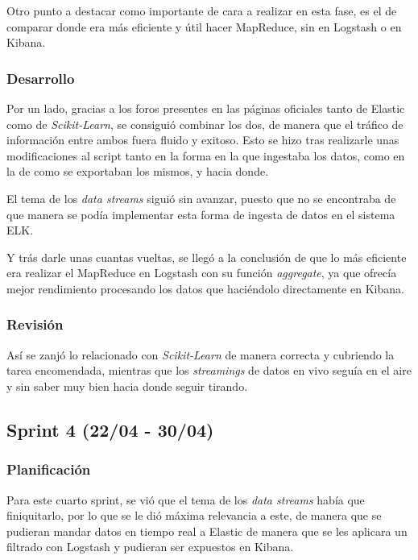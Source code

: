 Otro punto a destacar como importante de cara a realizar en esta fase, es el de comparar donde era más eficiente y útil hacer MapReduce, sin en Logstash o en Kibana.

\subsubsection{Desarrollo}
Por un lado, gracias a los foros presentes en las páginas oficiales tanto de Elastic como de \textit{Scikit-Learn}, se consiguió combinar los dos, de manera que el tráfico de información entre ambos fuera fluido y exitoso. Esto se hizo tras realizarle unas modificaciones al script tanto en la forma en la que ingestaba los datos, como en la de como se exportaban los mismos, y hacia donde.

El tema de los \textit{data streams} siguió sin avanzar, puesto que no se encontraba de que manera se podía implementar esta forma de ingesta de datos en el sistema ELK. 

Y trás darle unas cuantas vueltas, se llegó a la conclusión de que lo más eficiente era realizar el MapReduce en Logstash con su función \textit{aggregate}, ya que ofrecía mejor rendimiento procesando los datos que haciéndolo directamente en Kibana.

\subsubsection{Revisión}
Así se zanjó lo relacionado con \textit{Scikit-Learn} de manera correcta y cubriendo la tarea encomendada, mientras que los \textit{streamings} de datos en vivo seguía en el aire y sin saber muy bien hacia donde seguir tirando.

\paragraph{}
\paragraph{}
\paragraph{}


\subsection{Sprint 4 (22/04 - 30/04)}
\subsubsection{Planificación}
Para este cuarto sprint, se vió que el tema de los \textit{data streams} había que finiquitarlo, por lo que se le dió máxima relevancia a este, de manera que se pudieran mandar datos en tiempo real a Elastic de manera que se les aplicara un filtrado con Logstash y pudieran ser expuestos en Kibana.

